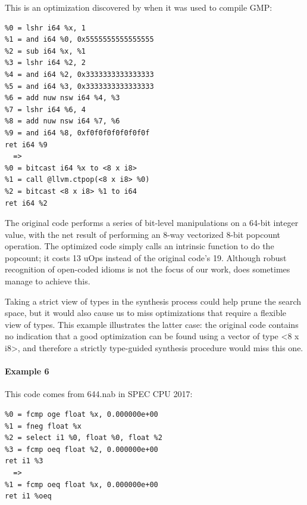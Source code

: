 This is an optimization discovered
by \minotaur{} when it was used to compile GMP:


{\begin{quoting}\begin{Verbatim}
%0 = lshr i64 %x, 1
%1 = and i64 %0, 0x5555555555555555
%2 = sub i64 %x, %1
%3 = lshr i64 %2, 2
%4 = and i64 %2, 0x3333333333333333
%5 = and i64 %3, 0x3333333333333333
%6 = add nuw nsw i64 %4, %3
%7 = lshr i64 %6, 4
%8 = add nuw nsw i64 %7, %6
%9 = and i64 %8, 0xf0f0f0f0f0f0f0f
ret i64 %9
  =>
%0 = bitcast i64 %x to <8 x i8>
%1 = call @llvm.ctpop(<8 x i8> %0)
%2 = bitcast <8 x i8> %1 to i64
ret i64 %2
\end{Verbatim}
\end{quoting}}

%
%
The original code performs a series of bit-level
manipulations on a 64-bit integer value, with the net result of
performing an 8-way vectorized 8-bit popcount operation.
%
The optimized code simply calls an intrinsic function to do the
popcount; it costs 13 uOps instead of the original code's 19.
%
Although robust recognition of open-coded idioms is not the focus
of our work, \minotaur{} does sometimes manage to achieve this.

Taking a strict view of types in the synthesis process could help
prune the search space, but it would also cause us to miss
optimizations that require a flexible view of types.
%
This example illustrates the latter case: the original code contains
no indication that a good optimization can be found using a vector of
type <8 x i8>, and therefore a strictly type-guided synthesis
procedure would miss this one.

\paragraph*{Example 6}

This code comes from 644.nab in SPEC CPU 2017:

{\begin{quoting}\begin{Verbatim}
%0 = fcmp oge float %x, 0.000000e+00
%1 = fneg float %x
%2 = select i1 %0, float %0, float %2
%3 = fcmp oeq float %2, 0.000000e+00
ret i1 %3
  =>
%1 = fcmp oeq float %x, 0.000000e+00
ret i1 %oeq
\end{Verbatim}
\end{quoting}}

